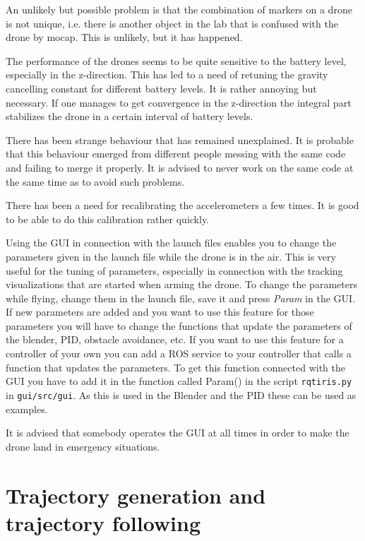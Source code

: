 \documentclass[titlepage,11pt,a4paper]{article}
\begin{document}
An unlikely but possible problem is that the combination of markers on
a drone is not unique, i.e. there is another object in the lab that is
confused with the drone by mocap. This is unlikely, but it has
happened.

The performance of the drones seems to be quite sensitive to the
battery level, especially in the z-direction. This has led to a need
of retuning the gravity cancelling constant for different battery
levels. It is rather annoying but necessary. If one manages to get
convergence in the z-direction the integral part stabilizes the drone
in a certain interval of battery levels.

There has been strange behaviour that has remained unexplained. It is
probable that this behaviour emerged from different people messing
with the same code and failing to merge it properly. It is advised to
never work on the same code at the same time as to avoid such
problems.

There has been a need for recalibrating the accelerometers a few
times. It is good to be able to do this calibration rather quickly.

Using the GUI in connection with the launch files enables you to
change the parameters given in the launch file while the drone is in
the air. This is very useful for the tuning of parameters, especially
in connection with the tracking visualizations that are started when
arming the drone. To change the parameters while flying, change them
in the launch file, save it and press \textit{Param} in the GUI. If new
parameters are added and you want to use this feature for those
parameters you will have to change the functions that update the
parameters of the blender, PID, obstacle avoidance, etc. If you want
to use this feature for a controller of your own you can add a ROS
service to your controller that calls a function that updates the
parameters. To get this function connected with the GUI you have to
add it in the function called Param() in the script
\texttt{rqt\textunderscore iris.py} in \texttt{gui/src/gui}. As this is used in
the Blender and the PID these can be used as examples.

It is advised that somebody operates the GUI at all times in order to
make the drone land in emergency situations.


\section{Trajectory generation and trajectory following}
\label{sec:trajectory}
\end{document}
